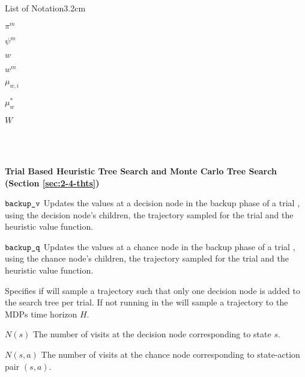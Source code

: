 \begin{mclistof}{List of Notation}{3.2cm}
    \item[$\pi^m$] 
    \item[$\psi^m$] 
    \item[$w$] 
    \item[$w^m$] 
    \item[$\mu_{w,i}$] 
    \item[$\mu_{w}^*$] 
    \item[$W$] 
    \item[$ $] 
    \item[$ $] 
    \item[$ $] 
    \item[$ $] 
    \\
    \item[{\parbox[t]{\textwidth}{\Large\textbf{Trial Based Heuristic Tree Search and Monte Carlo Tree Search (Section \ref{sec:2-4-thts})}\hfill\hfill}}]
    \item[${\textnormal{\texttt{backup\_v}}}$]
        Updates the values at a decision node in the backup phase of a trial \thtspp, using the decision node's children, the trajectory sampled for the trial and the heuristic value function.
    \item[${\textnormal{\texttt{backup\_q}}}$] 
        Updates the values at a chance node in the backup phase of a trial \thtspp, using the chance node's children, the trajectory sampled for the trial and the heuristic value function.
    \item[\mctsmode] 
        Specifies if \thtspp\ewe will sample a trajectory such that only one decision node is added to the search tree per trial. If not running in \mctsmode\ewe the \thtspp\ewe will sample a trajectory to the MDPs time horizon $H$.
    \item[$N(s)$]
        The number of visits at the decision node corresponding to state $s$.
    \item[$N(s,a)$]
        The number of visits at the chance node corresponding to state-action pair $(s,a)$.

\end{mclistof}
